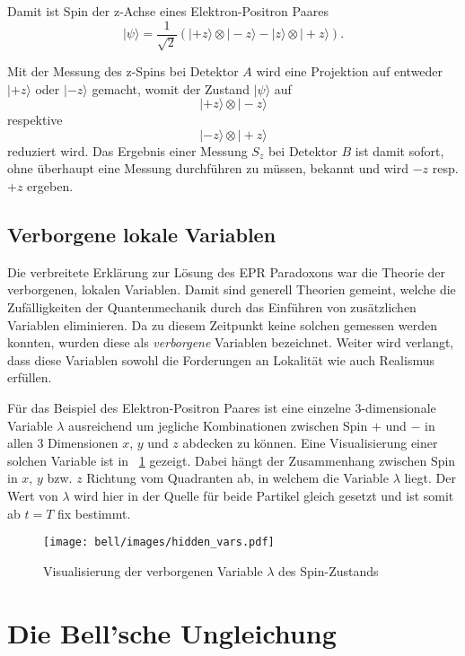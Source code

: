 \begin{refsection}
Damit ist Spin der z-Achse eines Elektron-Positron Paares
\begin{equation}
    |\psi\rangle = \frac{1}{\sqrt{2}} \left( 
        |{+}z\rangle \otimes |{-}z\rangle - |{}z\rangle \otimes |{+}z\rangle
     \right).
\end{equation}

Mit der Messung des z-Spins bei Detektor $A$ wird eine Projektion auf
entweder $|{+}z\rangle$ oder $|{-}z\rangle$ gemacht, womit der Zustand
$|\psi\rangle$ auf
\[
    |{+}z\rangle \otimes |{-}z\rangle
\]
respektive
\[
    |{-}z\rangle \otimes |{+}z\rangle
\]
reduziert wird.
Das Ergebnis einer Messung $S_z$ bei Detektor $B$ ist damit sofort, 
ohne \"uberhaupt eine Messung durchf\"uhren zu m\"ussen, bekannt und wird
$-z$ resp. $+z$ ergeben.


\subsection{Verborgene lokale Variablen}
Die verbreitete Erkl\"arung zur L\"osung des EPR Paradoxons war die Theorie
der verborgenen, lokalen Variablen. Damit sind generell Theorien gemeint,
welche die Zuf\"alligkeiten der Quantenmechanik durch das Einf\"uhren von
zus\"atzlichen Variablen eliminieren. Da zu diesem Zeitpunkt keine solchen
gemessen werden konnten, wurden diese als \emph{verborgene}
Variablen bezeichnet. Weiter wird verlangt, dass diese Variablen sowohl
die Forderungen an Lokalit\"at wie auch Realismus erf\"ullen.

F\"ur das Beispiel des Elektron-Positron Paares ist eine 
einzelne 3-dimensionale Variable $\lambda$ ausreichend um jegliche
Kombinationen zwischen Spin $+$ und $-$ in allen 3 Dimensionen 
$x$, $y$ und $z$ abdecken zu k\"onnen.
Eine Visualisierung einer solchen Variable ist in
\figurename~\ref{fig:Bell:hidden_var} gezeigt. Dabei h\"angt der Zusammenhang
zwischen Spin in $x$, $y$ bzw. $z$ Richtung vom Quadranten ab, in welchem
die Variable $\lambda$ liegt. Der Wert von $\lambda$ wird hier in der Quelle
f\"ur beide Partikel gleich gesetzt und ist somit ab $t=T$ fix bestimmt.

\begin{figure}
    \centering
    \texttt{[image: bell/images/hidden\_vars.pdf]}
    \caption{Visualisierung der verborgenen Variable $\lambda$ des Spin-Zustands}
    \label{fig:Bell:hidden_var}
\end{figure}


\section{Die Bell'sche Ungleichung}



\end{refsection}
